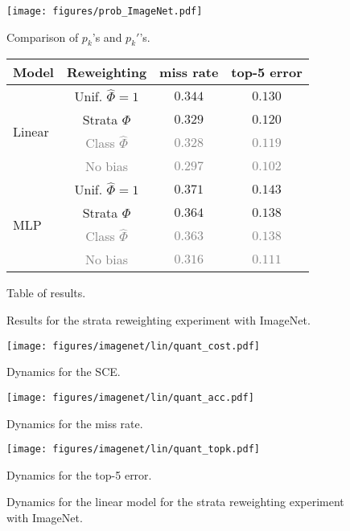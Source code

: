 \documentclass[12pt]{article}
\begin{document}
\begin{figure}[!htb]


  \texttt{[image: figures/prob\_ImageNet.pdf]}
\caption*{Comparison of $p_k$'s and $p_k'$'s.}\label{fig:prob_diff_ImageNet}
\endminipage\hfill
{}\center
    \begin{tabular}[t]{lccc}
	\toprule
	 Model & Reweighting & miss rate & top-5 error \\
	 \midrule
	 \multirow{4}{*}{Linear} & Unif. $\widehat{\Phi}=1$ & $0.344$ & $0.130$ \\
	    \cmidrule(lr){2-4}
	    & Strata  $\widehat{\Phi}$ & $ \mathbf{0.329}  $ & $\mathbf{0.120}  $ \\
	    \cmidrule(lr){2-4}
	    & \textcolor{gray}{Class $\widehat{\Phi}$} & \textcolor{gray}{ $0.328$ }
	    & \textcolor{gray}{ $0.119$ } \\
	    \cmidrule(lr){2-4}
	    & \textcolor{gray}{No bias} & \textcolor{gray}{ $0.297$ } &
	    \textcolor{gray}{ $0.102$ } \\
	    \midrule
	    \multirow{4}{*}{MLP} & Unif. $\widehat{\Phi} = 1$ & $0.371$ & $0.143$ \\
	    \cmidrule(lr){2-4}
	    & Strata $\widehat{\Phi}$ & $\mathbf{0.364}  $ & $\mathbf{0.138}  $ \\
	    \cmidrule(lr){2-4}
	    & \textcolor{gray}{Class $\widehat{\Phi}$} & \textcolor{gray}{ $0.363$ } &
	    \textcolor{gray}{ $0.138  $ } \\
	    \cmidrule(lr){2-4}
	    & \textcolor{gray}{No bias} & \textcolor{gray}{ $0.316  $ } &
	    \textcolor{gray}{ $0.111  $ } \\
\bottomrule
    \end{tabular}
    \caption*{Table of results.}\label{fig:prob_diff_ImageNet}
\endminipage
\caption{Results for the strata reweighting experiment with ImageNet.}\label{fig:ImageNet_res}
\end{figure}

\begin{figure}[!htb]


    \texttt{[image: figures/imagenet/lin/quant\_cost.pdf]}
\caption*{Dynamics for the SCE.}\label{fig:imgnetlin_quant_cost}
\endminipage
\hfill
{}


    \texttt{[image: figures/imagenet/lin/quant\_acc.pdf]}
\caption*{Dynamics for the miss rate.}\label{fig:imgnetlin_quant_acc}
\endminipage
\hfill
{}


    \texttt{[image: figures/imagenet/lin/quant\_topk.pdf]}
\caption*{Dynamics for the top-5 error.}\label{fig:imgnetlin_quant_topk}
\endminipage

\caption{Dynamics for the linear model for the strata reweighting experiment with ImageNet.}\label{fig:ImageNet_lin_dynamics}
\end{figure}
\end{document}
